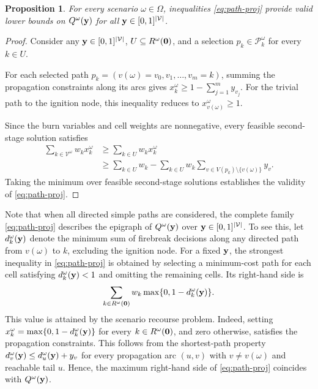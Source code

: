 \documentclass[a4paper,fleqn]{cas-sc}
\newtheorem{proposition}{Proposition}
\begin{document}
\begin{proposition}
\label{prop:path}
For every scenario $\omega \in \Omega$, inequalities
\eqref{eq:path-proj} provide valid lower bounds on
$Q^\omega(\vb{y})$ for all
$\vb{y} \in [0,1]^{|\mathcal{V}|}$.
\end{proposition}

\begin{proof}
Consider any $\vb{y} \in [0,1]^{|\mathcal{V}|}$,
$U \subseteq R^\omega(\vb{0})$, and a selection
$p_k \in \mathcal{P}_k^\omega$ for every $k \in U$.

For each selected path
$p_k=(v(\omega)=v_0,v_1,\ldots,v_m=k)$,
summing the propagation constraints along its arcs gives $x_k^\omega \geq
1-\sum_{j=1}^{m}y_{v_j}$. For the trivial path to the ignition node, this
inequality reduces to $x_{v(\omega)}^\omega \geq 1$.

Since the burn variables and cell weights are nonnegative,
every feasible second-stage solution satisfies
%
\begin{align*}
\sum_{k \in \mathcal{V}^\omega}w_k x_k^\omega
&\geq
\sum_{k \in U}w_k x_k^\omega
\nonumber\\
&\geq
\sum_{k \in U}w_k
-
\sum_{k \in U}w_k
\sum_{v \in V(p_k)\setminus\{v(\omega)\}}y_v.
\end{align*}
%
Taking the minimum over feasible second-stage solutions
establishes the validity of \eqref{eq:path-proj}.
\end{proof}

Note that when all directed simple paths are considered, the complete family \eqref{eq:path-proj} describes the epigraph of $Q^\omega(\vb{y})$ over
$\vb{y} \in [0,1]^{|\mathcal{V}|}$.  To see this, let $d_k^\omega(\vb{y})$ denote the minimum
sum of firebreak decisions along any directed path from
$v(\omega)$ to $k$, excluding the ignition node.
For a fixed $\vb{y}$, the strongest inequality in
\eqref{eq:path-proj} is obtained by selecting a
minimum-cost path for each cell satisfying
$d_k^\omega(\vb{y})<1$ and omitting the remaining cells.
Its right-hand side is
%
\[
\sum_{k \in R^\omega(\vb{0})}
w_k\max\{0,1-d_k^\omega(\vb{y})\}.
\]
%
This value is attained by the scenario recourse problem.
Indeed, setting
$x_k^\omega=\max\{0,1-d_k^\omega(\vb{y})\}$
for every $k \in R^\omega(\vb{0})$, and zero otherwise,
satisfies the propagation constraints.
This follows from the shortest-path property
$d_v^\omega(\vb{y})\leq d_u^\omega(\vb{y})+y_v$
for every propagation arc $(u,v)$ with
$v\neq v(\omega)$ and reachable tail $u$.
Hence, the maximum right-hand side of
\eqref{eq:path-proj} coincides with
$Q^\omega(\vb{y})$.
\end{document}
